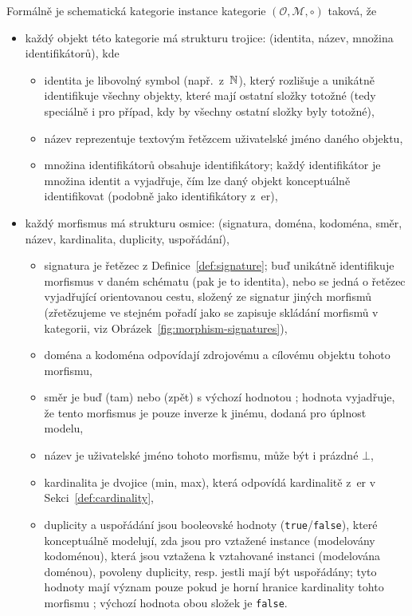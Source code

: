 Formálně je schematická kategorie instance kategorie $(\mathcal O, \mathcal M, \circ)$ taková, že
\begin{itemize}
  \item každý objekt této kategorie má strukturu trojice: (identita, název, množina identifikátorů), kde
        \begin{itemize}
          \item identita je libovolný symbol (např.~z~$\mathbb{N}$), který rozlišuje a unikátně identifikuje všechny objekty, které mají ostatní složky totožné (tedy speciálně i pro případ, kdy by všechny ostatní složky byly totožné),
          \item název reprezentuje textovým řetězcem uživatelské jméno daného objektu,
          \item množina identifikátorů obsahuje identifikátory; každý identifikátor je množina identit a vyjadřuje, čím lze daný objekt konceptuálně identifikovat (podobně jako identifikátory z~\acrshort{er}),
        \end{itemize}
  \item každý morfismus má strukturu osmice: (signatura, doména, kodoména, směr, název, kardinalita, duplicity, uspořádání),
        \begin{itemize}
          \item signatura je řetězec z Definice~\ref{def:signature}; buď unikátně identifikuje morfismus v daném schématu (pak je to identita), nebo se jedná o řetězec vyjadřující orientovanou cestu, složený ze signatur jiných morfismů (zřetězujeme ve stejném pořadí jako se zapisuje skládání morfismů v kategorii, viz Obrázek~\ref{fig:morphism-signatures}),
          \item doména a kodoména odpovídají zdrojovému a cílovému objektu tohoto morfismu,
          \item směr je buď \zero{} (tam) nebo \one{} (zpět) s výchozí hodnotou \zero{}; hodnota \one{} vyjadřuje, že tento morfismus je pouze inverze k jinému, dodaná pro úplnost modelu,
          \item název je uživatelské jméno tohoto morfismu, může být i prázdné $\bot$,
          \item kardinalita je dvojice (min, max), která odpovídá kardinalitě z~\acrshort{er} v Sekci~\ref{def:cardinality},
          \item duplicity a uspořádání jsou booleovské hodnoty (\texttt{true}/\texttt{false}), které konceptuálně modelují, zda jsou pro vztažené instance (modelovány kodoménou), která jsou vztažena k vztahované instanci (modelována doménou), povoleny duplicity, resp. jestli mají být uspořádány; tyto hodnoty mají význam pouze pokud je horní hranice kardinality tohto morfismu \many; výchozí hodnota obou složek je \texttt{false}.
        \end{itemize}
\end{itemize}

